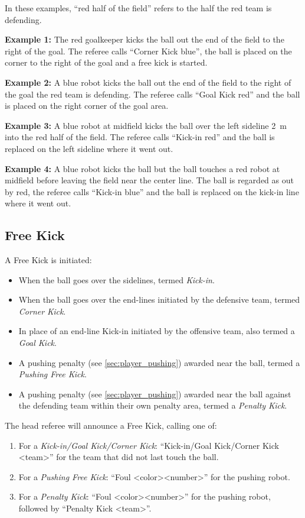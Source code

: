 In these examples, ``red half of the field'' refers to the half the red team is defending.

  \textbf{Example 1:} The red goalkeeper kicks the ball out the end of the field to the right of the goal. The referee calls ``Corner Kick blue'', the ball is placed on the corner to the right of the goal and a free kick is started.

  \textbf{Example 2:} A blue robot kicks the ball out the end of the field to the right of the goal the red team is defending. The referee calls ``Goal Kick red'' and the ball is placed on the right corner of the goal area.

  \textbf{Example 3:} A blue robot at midfield kicks the ball over the left sideline \qty{2}{\metre} into the red half of the field. The referee calls ``Kick-in red'' and the ball is replaced on the left sideline where it went out.

  \textbf{Example 4:} A blue robot kicks the ball but the ball touches a red robot at midfield before leaving the field near the center line. The ball is regarded as out by red, the referee calls ``Kick-in blue'' and the ball is replaced on the kick-in line where it went out.

\subsection{Free Kick}
\label{sec:free_kick}

A Free Kick is initiated:
\begin{itemize}
  \item When the ball goes over the sidelines, termed \emph{Kick-in}.
  \item When the ball goes over the end-lines initiated by the defensive team, termed \emph{Corner Kick}.
  \item In place of an end-line Kick-in initiated by the offensive team, also termed a \emph{Goal Kick}.
  \item A pushing penalty (see \cref{sec:player_pushing}) awarded near the ball, termed a \emph{Pushing Free Kick}.
  \item A pushing penalty (see \cref{sec:player_pushing}) awarded near the ball against the defending team within their own penalty area, termed a \textit{Penalty Kick}.
\end{itemize}

The head referee will announce a Free Kick, calling one of:
\begin{enumerate}
  \item For a \textit{Kick-in/Goal Kick/Corner Kick}: ``Kick-in/Goal Kick/Corner Kick \textless team\textgreater'' for the team that did not last touch the ball.
  \item For a \textit{Pushing Free Kick}: ``Foul \textless color\textgreater \textless number\textgreater'' for the pushing robot.
  \item For a \textit{Penalty Kick}: ``Foul \textless color\textgreater \textless number\textgreater'' for the pushing robot, followed by ``Penalty Kick \textless team\textgreater''.
\end{enumerate}


